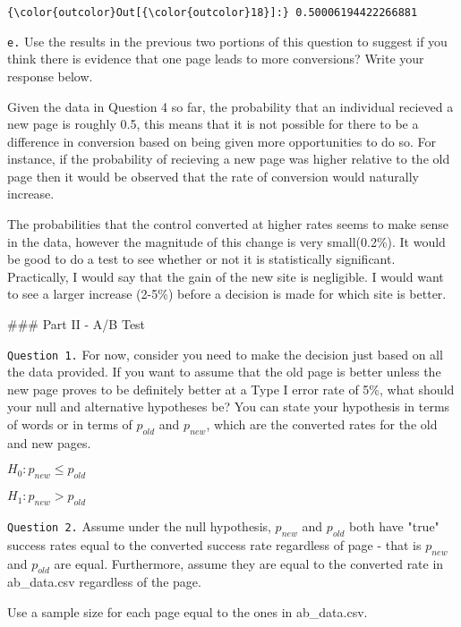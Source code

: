 \documentclass[11pt]{article}
\begin{document}
\begin{Verbatim}[commandchars=\\\{\}]
{\color{outcolor}Out[{\color{outcolor}18}]:} 0.50006194422266881
\end{Verbatim}
            
    \texttt{e.} Use the results in the previous two portions of this
question to suggest if you think there is evidence that one page leads
to more conversions? Write your response below.

    Given the data in Question 4 so far, the probability that an individual
recieved a new page is roughly 0.5, this means that it is not possible
for there to be a difference in conversion based on being given more
opportunities to do so. For instance, if the probability of recieving a
new page was higher relative to the old page then it would be observed
that the rate of conversion would naturally increase.

The probabilities that the control converted at higher rates seems to
make sense in the data, however the magnitude of this change is very
small(0.2\%). It would be good to do a test to see whether or not it is
statistically significant. Practically, I would say that the gain of the
new site is negligible. I would want to see a larger increase (2-5\%)
before a decision is made for which site is better.

     \#\#\# Part II - A/B Test

\texttt{Question\ 1.} For now, consider you need to make the decision
just based on all the data provided. If you want to assume that the old
page is better unless the new page proves to be definitely better at a
Type I error rate of 5\%, what should your null and alternative
hypotheses be? You can state your hypothesis in terms of words or in
terms of \textbf{\(p_{old}\)} and \textbf{\(p_{new}\)}, which are the
converted rates for the old and new pages.

    \(H_0: p_{new} \leq p_{old}\)

\(H_1: p_{new} > p_{old}\)

    \texttt{Question\ 2.} Assume under the null hypothesis, \(p_{new}\) and
\(p_{old}\) both have "true" success rates equal to the converted
success rate regardless of page - that is \(p_{new}\) and \(p_{old}\)
are equal. Furthermore, assume they are equal to the converted rate in
ab\_data.csv regardless of the page.

Use a sample size for each page equal to the ones in ab\_data.csv.
\end{document}
